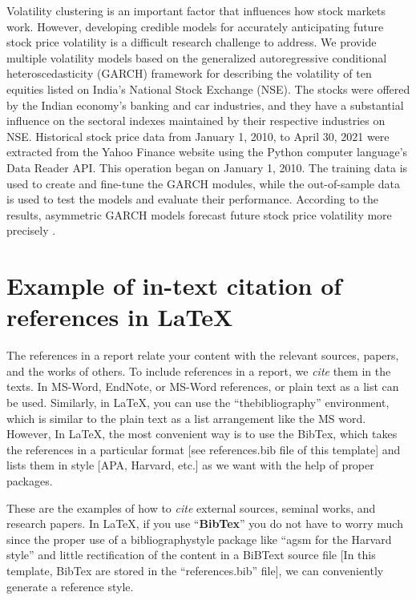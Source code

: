 Volatility clustering is an important factor that influences how stock markets work. However, developing credible models for accurately anticipating future stock price volatility is a difficult research challenge to address. We provide multiple volatility models based on the generalized autoregressive conditional heteroscedasticity (GARCH) framework for describing the volatility of ten equities listed on India's National Stock Exchange (NSE). The stocks were offered by the Indian economy's banking and car industries, and they have a substantial influence on the sectoral indexes maintained by their respective industries on NSE. Historical stock price data from January 1, 2010, to April 30, 2021 were extracted from the Yahoo Finance website using the Python computer language's Data Reader API. This operation began on January 1, 2010. The training data is used to create and fine-tune the GARCH modules, while the out-of-sample data is used to test the models and evaluate their performance. According to the results, asymmetric GARCH models forecast future stock price volatility more precisely \citep{sen2021volatility}.



\section{Example of in-text citation of references in \LaTeX} 
The references in a report relate your content with the relevant sources, papers, and the works of others. To include references in a report, we \textit{cite} them in the texts. In MS-Word, EndNote, or MS-Word references, or plain text as a list can be used. Similarly, in \LaTeX, you can use the ``thebibliography'' environment, which is similar to the plain text as a list arrangement like the MS word. However, In \LaTeX, the most convenient way is to use the BibTex, which takes the references in a particular format [see references.bib file of this template] and lists them in style [APA, Harvard, etc.] as we want with the help of proper packages.    

These are the examples of how to \textit{cite} external sources, seminal works, and research papers. In \LaTeX, if you use ``\textbf{BibTex}'' you do not have to worry much since the proper use of a bibliographystyle package like ``agsm for the Harvard style'' and little rectification of the content in a BiBText source file [In this template, BibTex are stored in the ``references.bib'' file], we can conveniently generate  a reference style. 

